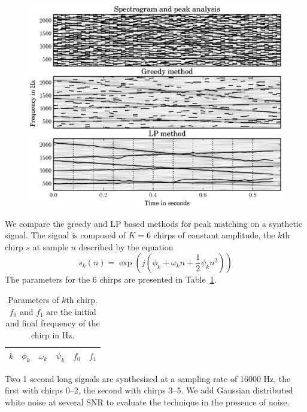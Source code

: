 \begin{figure}[!t]
    \centering
    \includegraphics[width=\figwidthscale\textwidth]{plots/mq_lp_compare_chirp_10.eps}
\end{figure}

We compare the greedy and LP based methods for peak matching on a synthetic
signal. The signal is composed of $K=6$ chirps of constant amplitude, the $k$th
chirp $s$ at sample $n$ described by the equation
\[
    s_{k}(n) = \exp(j(\phi_{k} + \omega_{k}n +
    \frac{1}{2} \psi_{k} n^{2}))
\]
The parameters for the 6 chirps are presented in
Table~\ref{tab:ptrackexamplechirpparams}.
\begin{table}
    \caption{Parameters of $k$th chirp. $f_{0}$ and $f_{1}$ are the initial and
    final frequency of the chirp in Hz. \label{tab:ptrackexamplechirpparams}}
    \begin{center}
        \begin{tabular}{l c c c c c}
            $k$ & $\phi_{k}$ & $\omega_{k}$ & $\psi_{k}$ & $f_{0}$ & $f_{1}$ \\
            \hline
            
        \end{tabular}
    \end{center}
\end{table}

Two 1 second long signals are synthesized at a sampling rate of 16000 Hz, the
first with chirps 0--2, the second with chirps 3--5. We add
Gaussian distributed white noise at several SNR to evaluate the technique in the
presence of noise.

